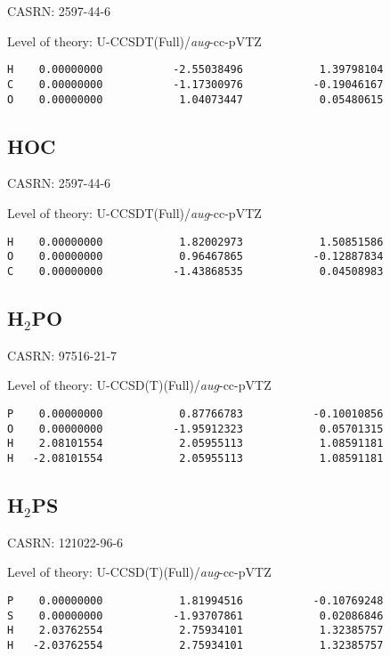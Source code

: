 \documentclass[journal=jctcce,manuscript=article,layout=traditional]{achemso}
\newcommand{\AVTZ}{\emph{aug}-cc-pVTZ}
\begin{document}
CASRN: 2597-44-6

\begin{singlespace}
\noindent Level of theory: U-CCSDT(Full)/{\AVTZ}
\begin{verbatim}
H    0.00000000           -2.55038496            1.39798104
C    0.00000000           -1.17300976           -0.19046167
O    0.00000000            1.04073447            0.05480615
\end{verbatim}
\end{singlespace}

\subsection{HOC}

CASRN: 2597-44-6

\begin{singlespace}
\noindent Level of theory: U-CCSDT(Full)/{\AVTZ}
\begin{verbatim}
H    0.00000000            1.82002973            1.50851586
O    0.00000000            0.96467865           -0.12887834
C    0.00000000           -1.43868535            0.04508983
 \end{verbatim}
\end{singlespace}

\subsection{H$_2$PO}

CASRN: 97516-21-7

\begin{singlespace}
\noindent Level of theory: U-CCSD(T)(Full)/{\AVTZ}
\begin{verbatim}
P    0.00000000            0.87766783           -0.10010856
O    0.00000000           -1.95912323            0.05701315
H    2.08101554            2.05955113            1.08591181
H   -2.08101554            2.05955113            1.08591181
\end{verbatim}
\end{singlespace}

\subsection{H$_2$PS}

CASRN: 121022-96-6

\begin{singlespace}
\noindent Level of theory: U-CCSD(T)(Full)/{\AVTZ}
\begin{verbatim}
P    0.00000000            1.81994516           -0.10769248
S    0.00000000           -1.93707861            0.02086846
H    2.03762554            2.75934101            1.32385757
H   -2.03762554            2.75934101            1.32385757
\end{verbatim}
\end{singlespace}
\end{document}
